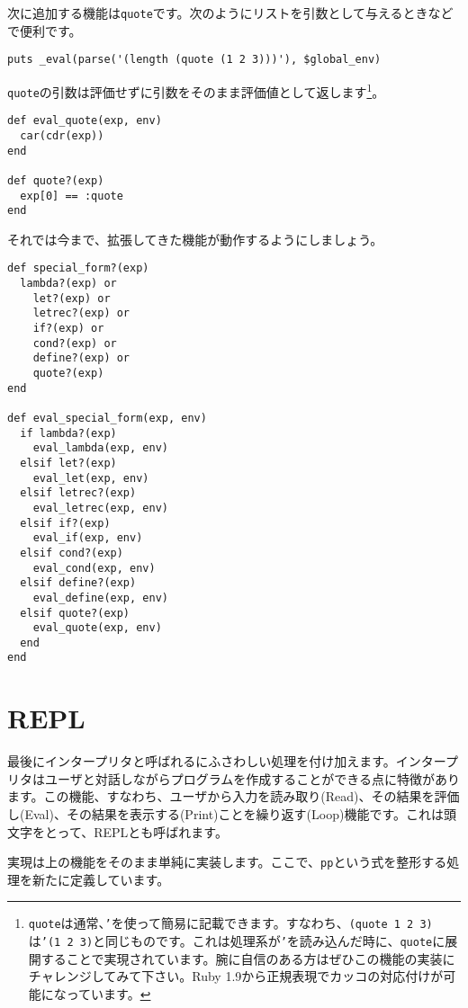 次に追加する機能は{\tt quote}です。次のようにリストを引数として与えるときなどで便利です。

\begin{lstlisting}
puts _eval(parse('(length (quote (1 2 3)))'), $global_env)
\end{lstlisting}

{\tt quote}の引数は評価せずに引数をそのまま評価値として返します\footnote{{\tt quote}は通常、{\tt '}を使って簡易に記載できます。すなわち、{\tt (quote 1 2 3)}は{\tt '(1 2 3)}と同じものです。これは処理系が{\tt '}を読み込んだ時に、{\tt quote}に展開することで実現されています。腕に自信のある方はぜひこの機能の実装にチャレンジしてみて下さい。Ruby 1.9から正規表現でカッコの対応付けが可能になっています。}。

\begin{lstlisting}
def eval_quote(exp, env)
  car(cdr(exp))
end

def quote?(exp)
  exp[0] == :quote
end
\end{lstlisting}

それでは今まで、拡張してきた機能が動作するようにしましょう。

\begin{lstlisting}
def special_form?(exp)
  lambda?(exp) or 
    let?(exp) or 
    letrec?(exp) or 
    if?(exp) or 
    cond?(exp) or 
    define?(exp) or 
    quote?(exp)
end

def eval_special_form(exp, env)
  if lambda?(exp)
    eval_lambda(exp, env)
  elsif let?(exp)
    eval_let(exp, env)
  elsif letrec?(exp)
    eval_letrec(exp, env)
  elsif if?(exp)
    eval_if(exp, env)
  elsif cond?(exp)
    eval_cond(exp, env)
  elsif define?(exp)
    eval_define(exp, env)
  elsif quote?(exp)
    eval_quote(exp, env)
  end
end
\end{lstlisting}

\section{REPL}

最後にインタープリタと呼ばれるにふさわしい処理を付け加えます。インタープリタはユーザと対話しながらプログラムを作成することができる点に特徴があります。この機能、すなわち、ユーザから入力を読み取り(Read)、その結果を評価し(Eval)、その結果を表示する(Print)ことを繰り返す(Loop)機能です。これは頭文字をとって、REPLとも呼ばれます。

実現は上の機能をそのまま単純に実装します。ここで、{\tt pp}という式を整形する処理を新たに定義しています。


